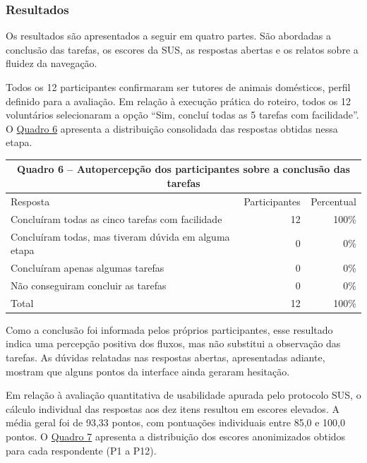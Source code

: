 \subsubsection{Resultados}

Os resultados são apresentados a seguir em quatro partes. São abordadas a conclusão das tarefas, os escores da SUS, as respostas abertas e os relatos sobre a fluidez da navegação.

Todos os 12 participantes confirmaram ser tutores de animais domésticos, perfil definido para a avaliação. Em relação à execução prática do roteiro, todos os 12 voluntários selecionaram a opção ``Sim, concluí todas as 5 tarefas com facilidade''. O \hyperref[quadro:conclusao_tarefas]{Quadro 6} apresenta a distribuição consolidada das respostas obtidas nessa etapa.

\begin{table}[H]
    \centering
    \hypertarget{quadro:conclusao_tarefas}{}\label{quadro:conclusao_tarefas}
    \small
    \renewcommand{\arraystretch}{1.15}
    \begin{tabular}{|p{8.4cm}|r|r|}
        \hline
        \multicolumn{3}{|c|}{Quadro 6 -- Autopercepção dos participantes sobre a conclusão das tarefas} \\ \hline
        Resposta & Participantes & Percentual \\ \hline
        Concluíram todas as cinco tarefas com facilidade & 12 & 100\% \\ \hline
        Concluíram todas, mas tiveram dúvida em alguma etapa & 0 & 0\% \\ \hline
        Concluíram apenas algumas tarefas & 0 & 0\% \\ \hline
        Não conseguiram concluir as tarefas & 0 & 0\% \\ \hline
        Total & 12 & 100\% \\ \hline
    \end{tabular}
\end{table}

Como a conclusão foi informada pelos próprios participantes, esse resultado indica uma percepção positiva dos fluxos, mas não substitui a observação das tarefas. As dúvidas relatadas nas respostas abertas, apresentadas adiante, mostram que alguns pontos da interface ainda geraram hesitação.

Em relação à avaliação quantitativa de usabilidade apurada pelo protocolo SUS, o cálculo individual das respostas aos dez itens resultou em escores elevados. A média geral foi de 93,33 pontos, com pontuações individuais entre 85,0 e 100,0 pontos. O \hyperref[quadro:escores_sus]{Quadro 7} apresenta a distribuição dos escores anonimizados obtidos para cada respondente (P1 a P12).

